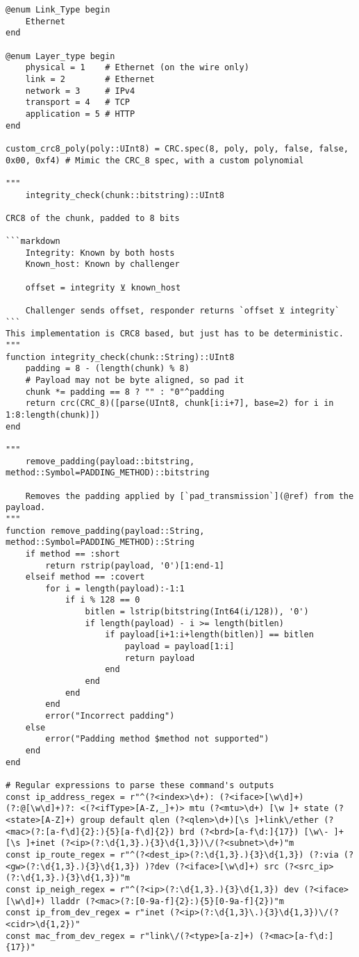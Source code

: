 \begin{lstlisting}[language=JuliaLocal, style=julia]
@enum Link_Type begin
    Ethernet
end

@enum Layer_type begin
    physical = 1    # Ethernet (on the wire only)
    link = 2        # Ethernet
    network = 3     # IPv4
    transport = 4   # TCP
    application = 5 # HTTP
end

custom_crc8_poly(poly::UInt8) = CRC.spec(8, poly, poly, false, false, 0x00, 0xf4) # Mimic the CRC_8 spec, with a custom polynomial

"""
    integrity_check(chunk::bitstring)::UInt8

CRC8 of the chunk, padded to 8 bits

```markdown
    Integrity: Known by both hosts
    Known_host: Known by challenger
    
    offset = integrity ⊻ known_host

    Challenger sends offset, responder returns `offset ⊻ integrity`
```
This implementation is CRC8 based, but just has to be deterministic.
"""
function integrity_check(chunk::String)::UInt8
    padding = 8 - (length(chunk) % 8)
    # Payload may not be byte aligned, so pad it
    chunk *= padding == 8 ? "" : "0"^padding
    return crc(CRC_8)([parse(UInt8, chunk[i:i+7], base=2) for i in 1:8:length(chunk)])
end

"""
    remove_padding(payload::bitstring, method::Symbol=PADDING_METHOD)::bitstring

    Removes the padding applied by [`pad_transmission`](@ref) from the payload.
"""
function remove_padding(payload::String, method::Symbol=PADDING_METHOD)::String
    if method == :short
        return rstrip(payload, '0')[1:end-1]
    elseif method == :covert
        for i = length(payload):-1:1
            if i % 128 == 0
                bitlen = lstrip(bitstring(Int64(i/128)), '0')
                if length(payload) - i >= length(bitlen)
                    if payload[i+1:i+length(bitlen)] == bitlen
                        payload = payload[1:i]
                        return payload
                    end
                end
            end
        end
        error("Incorrect padding")
    else
        error("Padding method $method not supported")
    end
end

# Regular expressions to parse these command's outputs
const ip_address_regex = r"^(?<index>\d+): (?<iface>[\w\d]+)(?:@[\w\d]+)?: <(?<ifType>[A-Z,_]+)> mtu (?<mtu>\d+) [\w ]+ state (?<state>[A-Z]+) group default qlen (?<qlen>\d+)[\s ]+link\/ether (?<mac>(?:[a-f\d]{2}:){5}[a-f\d]{2}) brd (?<brd>[a-f\d:]{17}) [\w\- ]+[\s ]+inet (?<ip>(?:\d{1,3}.){3}\d{1,3})\/(?<subnet>\d+)"m
const ip_route_regex = r"^(?<dest_ip>(?:\d{1,3}.){3}\d{1,3}) (?:via (?<gw>(?:\d{1,3}.){3}\d{1,3}) )?dev (?<iface>[\w\d]+) src (?<src_ip>(?:\d{1,3}.){3}\d{1,3})"m
const ip_neigh_regex = r"^(?<ip>(?:\d{1,3}.){3}\d{1,3}) dev (?<iface>[\w\d]+) lladdr (?<mac>(?:[0-9a-f]{2}:){5}[0-9a-f]{2})"m
const ip_from_dev_regex = r"inet (?<ip>(?:\d{1,3}\.){3}\d{1,3})\/(?<cidr>\d{1,2})"
const mac_from_dev_regex = r"link\/(?<type>[a-z]+) (?<mac>[a-f\d:]{17})"


\end{lstlisting}
